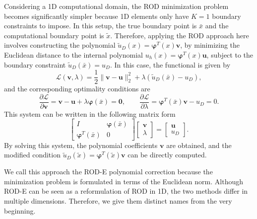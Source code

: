 \documentclass{article}
\renewcommand{\phi}{\varphi}
\begin{document}
Considering a 1D computational domain, the ROD minimization problem becomes significantly simpler because 1D elements only have $K=1$ boundary constraints to impose. In this setup, the true boundary point is $\bar x$ and the computational boundary point is $\tilde x$. Therefore, applying the ROD approach here involves constructing the polynomial $\tilde u_D(x)=\boldsymbol{\phi}^T(x)\boldsymbol{v}$, by minimizing the Euclidean distance to the internal polynomial $u_h(x)=\boldsymbol{\phi}^T(x)\boldsymbol{u}$, subject to the boundary constraint $\tilde u_D(\bar x) = u_D$. In this case, the functional is given by
\begin{equation}
    \mathcal{L}(\boldsymbol{v} , \lambda) = \frac12\|\boldsymbol{v}-\boldsymbol{u}\|^2_2 + \lambda ( \tilde u_D(\bar x) - u_D ),
\end{equation}
and the corresponding optimality conditions are
\begin{equation}\label{eq:optcondRODE}
    \frac{\partial \mathcal{L}}{\partial \boldsymbol{v}} = \boldsymbol{v} - \boldsymbol{u} + \lambda  \boldsymbol{\phi}(\bar x) = \boldsymbol{0} , \qquad \frac{\partial \mathcal{L}}{\partial \lambda} = \boldsymbol{\phi}^T(\bar x) \boldsymbol{v} - u_D = 0.
\end{equation}
This system can be written in the following matrix form
\begin{equation}\label{eq:RODsystem}
\begin{bmatrix} I & \boldsymbol{\phi}(\bar x) \\ \boldsymbol{\phi}^T(\bar x) & 0 \end{bmatrix} \begin{bmatrix}\boldsymbol{v} \\ \lambda \end{bmatrix} = \begin{bmatrix} \boldsymbol{u} \\ u_D \end{bmatrix}.
\end{equation}
By solving this system, the polynomial coefficients $\boldsymbol{v}$ are obtained, and the modified condition $\tilde{u}_D(\tilde x)=\boldsymbol{\phi}^T(\tilde x)\boldsymbol{v}$ can be directly computed.

We call this approach the ROD-E polynomial correction because the minimization problem is formulated in terms of the Euclidean norm. Although ROD-E can be seen as a reformulation of ROD in 1D, the two methods differ in multiple dimensions. Therefore, we give them distinct names from the very beginning.
\end{document}
